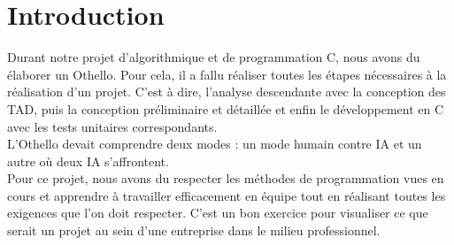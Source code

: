 \section{Introduction}
Durant notre projet d’algorithmique et de programmation C, nous avons du élaborer un Othello. Pour cela, il a fallu réaliser toutes les étapes nécessaires à la réalisation d'un projet. C'est à dire, l'analyse descendante avec la conception des TAD, puis la conception préliminaire et détaillée et enfin le développement en C avec les tests unitaires correspondants.\\


 L'Othello devait comprendre deux modes : un mode humain contre IA et un autre où deux IA s'affrontent. \\
 
 
 Pour ce projet, nous avons du respecter les méthodes de programmation vues en cours et apprendre à travailler efficacement en équipe tout en réalisant toutes les exigences que l'on doit respecter. C'est un bon exercice pour visualiser ce que serait un projet au sein d'une entreprise dans le milieu professionnel.